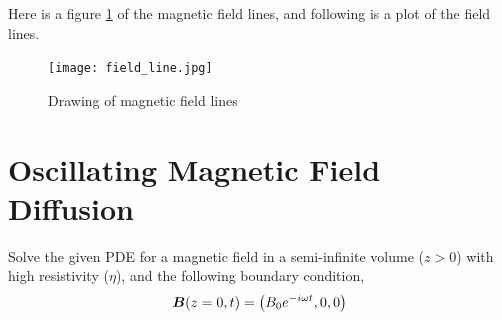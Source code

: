 \documentclass{article}
\begin{document}
Here is a figure \ref{fig:p1} of the magnetic field lines, and following is a plot of the
field lines. 

\begin{figure}
    \centering
    \texttt{[image: field\_line.jpg]}
    \caption{Drawing of magnetic field lines}
    \label{fig:p1}
\end{figure}


\section{Oscillating Magnetic Field Diffusion}

Solve the given PDE for a magnetic field in a semi-infinite volume ($z > 0$)
with high resistivity ($\eta$), and the following boundary condition,
\begin{gather*}
    \boldsymbol{B}(z=0,t) = \left(B_0e^{-i\omega t}, 0, 0\right)
\end{gather*}
\end{document}

